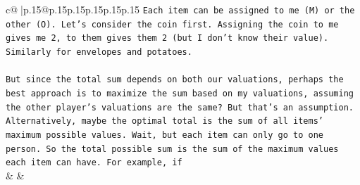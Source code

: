 \documentclass{article}
\begin{document}
{\begin{supertabular}{c@{$\;$}|p{.15\linewidth}@{}p{.15\linewidth}p{.15\linewidth}p{.15\linewidth}p{.15\linewidth}p{.15\linewidth}}
{{{\texttt{Each item can be assigned to me (M) or the other (O). Let's consider the coin first. Assigning the coin to me gives me 2, to them gives them 2 (but I don't know their value). Similarly for envelopes and potatoes.} \\
\\ 
\texttt{But since the total sum depends on both our valuations, perhaps the best approach is to maximize the sum based on my valuations, assuming the other player's valuations are the same? But that's an assumption. Alternatively, maybe the optimal total is the sum of all items' maximum possible values. Wait, but each item can only go to one person. So the total possible sum is the sum of the maximum values each item can have. For example, if} \\
            }
        }
    }
    & & \\ \\


\end{supertabular}}
\end{document}
